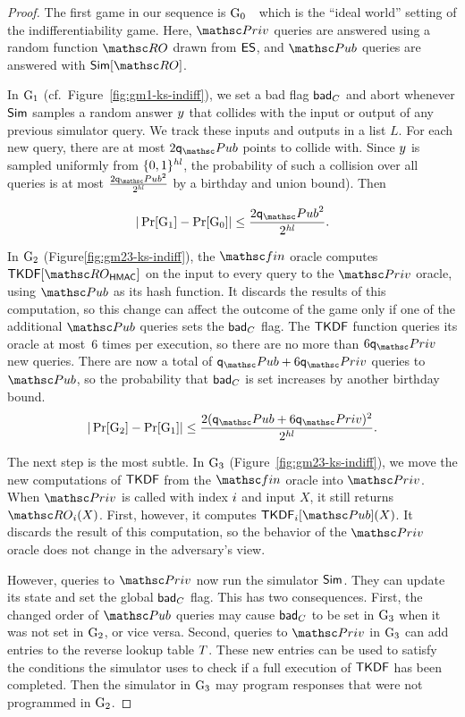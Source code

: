 \begin{proof}
	The first game in our sequence is $\textnormal{G}_0$~\, which is the ``ideal world'' setting of the indifferentiability game.
	Here, $\PrivO$ queries are answered using a random function $\RO$ drawn from $\mathsf{ES}$, and $\PubO$ queries are answered with $\Sim[\RO]$.
	
	In $\textnormal{G}_1$ (cf.\ Figure~\ref{fig:gm1-ks-indiff}), we set a bad flag $\mathsf{bad}_C$ and abort whenever $\mathsf{Sim}$ samples a random answer $y$ that collides with the input or output of any previous simulator query. 
	We track these inputs and outputs in a list $L$. 
	For each new query, there are at most $2\qPub$ points to collide with.
	Since $y$ is sampled uniformly from $\{0,1\}^{\mathit{hl}}$, the probability of such a collision over all queries is at most $\frac{2\qPub^2}{2^{\hashlen}}$ by a birthday and union bound). Then 
	
	\[ |\Pr[\Gm_1] - \Pr[\Gm_0]| \leq \frac{2\qPub^2}{2^{\hashlen}}. \] 
	
	In $\textnormal{G}_2$ (Figure\ref{fig:gm23-ks-indiff}), the $\Finalize$ oracle computes $\TLSKDF[\ROhmac]$ on the input to every query to the $\PrivO$ oracle, using $\PubO$ as its hash function. It discards the results of this computation, so this change can affect the outcome of the game only if one of the additional $\PubO$ queries sets the $\mathsf{bad}_C$ flag. The $\mathsf{TKDF}$ function queries its oracle at most~$6$ times per execution, so there are no more than $6\qPriv$ new queries. There are now a total of $\qPub + 6\qPriv$ queries to $\PubO$, so the probability that $\mathsf{bad}_C$ is set increases by another birthday bound.
	\[ |\Pr[\Gm_2] - \Pr[\Gm_1]| \leq \frac{2(\qPub+6\qPriv)^2}{2^{\hashlen}}. \] 
	
	
	The next step is the most subtle. 
	In $\textnormal{G}_3$ (Figure~\ref{fig:gm23-ks-indiff}), we move the new computations of $\mathsf{TKDF}$ from the $\Finalize$ oracle into $\PrivO$.
	When $\PrivO$ is called with index $i$ and input $X$, it still returns $\RO_{\simIndex}(X)$. 
	First, however, it computes $\TLSKDF_{\simIndex}[\PubO](X)$. 
	It discards the result of this computation, so the behavior of the $\PrivO$ oracle does not change in the adversary's view.
	
	However, queries to $\PrivO$ now run the simulator $\mathsf{Sim}$.
	They can update its state and set the global $\mathsf{bad}_C$ flag.
	This has two consequences.
	First, the changed order of $\PubO$ queries may cause $\mathsf{bad}_C$ to be set in $\textnormal{G}_3$ when it was not set in $\textnormal{G}_2$, or vice versa. 
	Second, queries to $\PrivO$ in $\textnormal{G}_3$ can add entries to the reverse lookup table $T$.
	These new entries can be used to satisfy the conditions the simulator uses to check if a full execution of $\mathsf{TKDF}$ has been completed.
	Then the simulator in $\textnormal{G}_3$ may program responses that were not programmed in $\textnormal{G}_2$. 
	

\end{proof}
